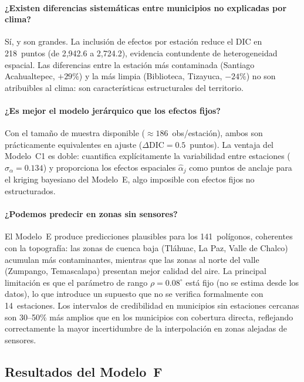 ﻿\documentclass[12pt]{article}
\begin{document}
\paragraph{¿Existen diferencias sistem\'aticas entre municipios no explicadas por clima?}
S\'i, y son grandes.
La inclusi\'on de efectos por estaci\'on reduce el DIC en 218~puntos
(de 2{,}942.6 a 2{,}724.2), evidencia contundente de heterogeneidad
espacial.
Las diferencias entre la estaci\'on m\'as contaminada (Santiago
Acahualtepec, $+29\%$) y la m\'as limpia (Biblioteca, Tizayuca, $-24\%$)
no son atribuibles al clima: son caracter\'isticas estructurales del
territorio.

\paragraph{¿Es mejor el modelo jer\'arquico que los efectos fijos?}
Con el tama\~no de muestra disponible ($\approx 186$~obs/estaci\'on),
ambos son pr\'acticamente equivalentes en ajuste
($\Delta\text{DIC} = 0.5$~puntos).
La ventaja del Modelo~C1 es doble: cuantifica expl\'icitamente la
variabilidad entre estaciones ($\hat\sigma_\alpha = 0.134$) y proporciona
los efectos espaciales $\hat\alpha_j$ como puntos de anclaje para el
kriging bayesiano del Modelo~E, algo imposible con efectos fijos
no estructurados.

\paragraph{¿Podemos predecir en zonas sin sensores?}
El Modelo~E produce predicciones plausibles para los 141~pol\'igonos,
coherentes con la topograf\'ia: las zonas de cuenca baja (Tl\'ahuac,
La Paz, Valle de Chalco) acumulan m\'as contaminantes, mientras que
las zonas al norte del valle (Zumpango, Temascalapa) presentan mejor
calidad del aire.
La principal limitaci\'on es que el par\'ametro de rango $\rho = 0.08^\circ$
est\'a fijo (no se estima desde los datos), lo que introduce un supuesto
que no se verifica formalmente con 14~estaciones.
Los intervalos de credibilidad en municipios sin estaciones cercanas son
30--50\% m\'as amplios que en los municipios con cobertura directa,
reflejando correctamente la mayor incertidumbre de la interpolaci\'on
en zonas alejadas de sensores.



\subsection{Resultados del Modelo~F}
\end{document}
